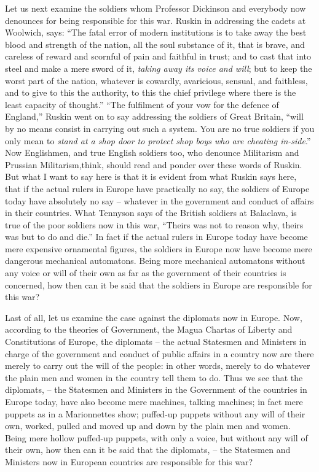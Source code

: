 Let us next examine the soldiers whom Professor Dickinson and everybody now denounces
for being responsible for this war.
Ruskin in addressing the cadets at Woolwich, says:
``The fatal error of modern institutions is to take away the best blood and strength of the nation,
all the soul substance of it, that is brave, and careless of reward and scornful of pain and faithful in trust;
and to cast that into steel and make a mere sword of it,
\emph{taking away its voice and will};
but to keep the worst part of the nation,
whatever is cowardly, avaricious, sensual, and faithless, and to give to this the authority,
to this the chief privilege where there is the least capacity of thought.''
``The fulfilment of your vow for the defence of England,''
Ruskin went on to say addressing the soldiers of Great Britain,
``will by no means consist in carrying out such a system.
You are no true soldiers if you only mean to \emph{stand at a shop door to protect shop boys who are cheating in-side}.''
Now Englishmen, and true English soldiers too, who denounce Militarism and Prussian Militarism,think, should read and ponder over these words of Ruskin.
But what I want to say here is that it is evident from what Ruskin says here,
that if the actual rulers in Europe have practically no say,
the soldiers of Europe today have absolutely no say
-- whatever in the government and conduct of affairs in their countries.
What Tennyson says of the British soldiers at Balaclava, is true of the poor soldiers now in this war,
``Theirs was not to reason why, theirs was but to do and die.''
In fact if the actual rulers in Europe today have become mere expensive ornamental figures,
the soldiers in Europe now have become mere dangerous mechanical automatons.
Being more mechanical automatons without any voice or will of their own as far as the government of their countries is concerned,
how then can it be said that the soldiers in Europe are responsible for this war?

Last of all, let us examine the case against the diplomats now in Europe.
Now, according to the theories of Government,
the Magua Chartas of Liberty and Constitutions of Europe, the diplomats 
-- the actual Statesmen and Ministers in charge of the government and conduct of public affairs in a country now are there merely to carry out the will of the people:
in other words, merely to do whatever the plain men and women in the country tell them to do.
Thus we see that the diplomats,
-- the Statesmen and Ministers in the Government of the countries in Europe today,
have also become mere machines, talking machines;
in fact mere puppets as in a Marionnettes show;
puffed-up puppets without any will of their own, worked,
pulled and moved up and down by the plain men and women.
Being mere hollow puffed-up puppets, with only a voice,
but without any will of their own, how then can it be said that the diplomats,
-- the Statesmen and Ministers now in European countries are responsible for this war?

